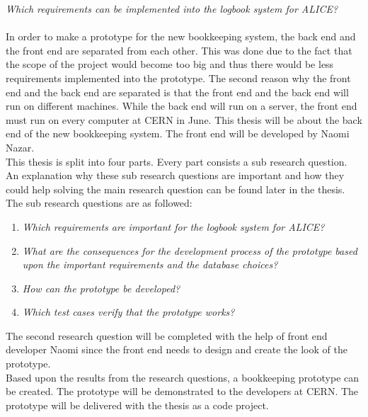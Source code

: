 \documentclass[paper=a4, fontsize=11pt,twoside]{scrartcl}	%
\begin{document}
\textit{Which requirements can be implemented into the logbook system for ALICE?}
\\ \\
In order to make a prototype for the new bookkeeping system, the back end and the front end are separated from each other. This was done due to the fact that the scope of the project would become too big and thus there would be less requirements implemented into the prototype. The second reason why the front end and the back end are separated is that the front end and the back end will run on different machines. While the back end will run on a server, the front end must run on every computer at CERN in June. This thesis will be about the back end of the new bookkeeping system. The front end will be developed by Naomi Nazar.
\\ 
This thesis is split into four parts. Every part consists a sub research question. An explanation why these sub research questions are important and how they could help solving the main research question can be found later in the thesis. The sub research questions are as followed: \\
\begin{enumerate}
\item \textit{Which requirements are important for the logbook system for ALICE?}
\item \textit{What are the consequences for the development process of the prototype based upon the important requirements and the database choices?}
\item \textit{How can the prototype be developed?}
\item \textit{Which test cases verify that the prototype works?}
\end{enumerate}
The second research question will be completed with the help of front end developer Naomi since the front end needs to design and create the look of the prototype. \\
Based upon the results from the research questions, a bookkeeping prototype can be created. The prototype will be demonstrated to the developers at CERN. The prototype will be delivered with the thesis as a code project. 

 

\end{document}
